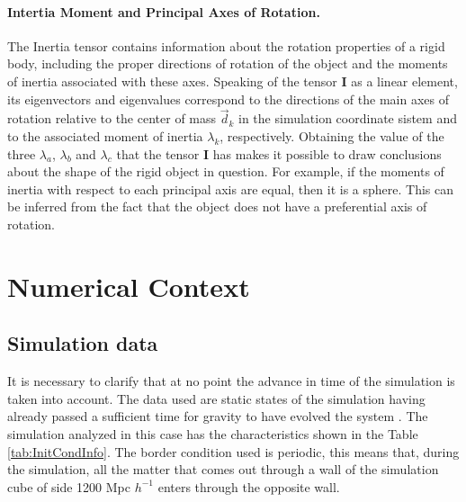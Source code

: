 \paragraph{Intertia Moment and Principal Axes of Rotation. }
The Inertia tensor contains information about the rotation properties of a rigid body, including the proper directions of rotation of the object and the moments of inertia associated with these axes. Speaking of the tensor \textbf{I} as a linear element, its eigenvectors and eigenvalues correspond to the directions of the main axes of rotation relative to the center of mass $\Vec{d}_k$ in the simulation coordinate sistem and to the associated moment of inertia $\lambda_k$, respectively.
Obtaining the value of the three $\lambda_a$, $\lambda_b$ and $\lambda_c$ that the tensor \textbf{I} has makes it possible to draw conclusions about the shape of the rigid object in question. For example, if the moments of inertia with respect to each principal axis are equal, then it is a sphere. This can be inferred from the fact that the object does not have a preferential axis of rotation.










\newpage

\section{Numerical Context}
\subsection{Simulation data}
\label{sec:SIMDATA}
It is necessary to clarify that at no point the advance in time of the simulation is taken into account. The data used are static states of the simulation having already passed a sufficient time for gravity to have evolved the system .
The simulation analyzed\cite{SimData} in this case has the characteristics shown in the Table \ref{tab:InitCondInfo}. The border condition used is periodic, this means that, during the simulation, all the matter that comes out through a wall of the simulation cube of side 1200 Mpc $h^{-1}$  enters through the opposite wall.



